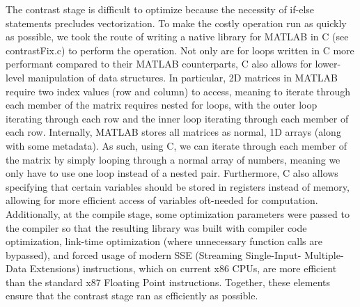 The contrast stage is difficult to optimize because the necessity of if-else statements precludes 
vectorization. To make the costly operation run as quickly as possible, we took the route of 
writing a native library for MATLAB in C (see contrastFix.c) to perform the operation. Not only 
are for loops written in C more performant compared to their MATLAB counterparts, C also allows 
for lower-level manipulation of data structures. In particular, 2D matrices in MATLAB require 
two index values (row and column) to access, meaning to iterate through each member of the matrix 
requires nested for loops, with the outer loop iterating through each row and the inner loop 
iterating through each member of each row. Internally, MATLAB stores all matrices as normal, 1D 
arrays (along with some metadata). As such, using C, we can iterate through each member of the matrix 
by simply looping through a normal array of numbers, meaning we only have to use one loop instead 
of a nested pair. Furthermore, C also allows specifying that certain variables should be stored in 
registers instead of memory, allowing for more efficient access of variables oft-needed for computation. 
Additionally, at the compile stage, some optimization parameters were passed to the compiler so that 
the resulting library was built with compiler code optimization, link-time optimization (where 
unnecessary function calls are bypassed), and forced usage of modern SSE (Streaming Single-Input-
Multiple-Data Extensions) instructions, which on current x86 CPUs, are more efficient than the 
standard x87 Floating Point instructions. Together, these elements ensure that the contrast stage 
ran as efficiently as possible.